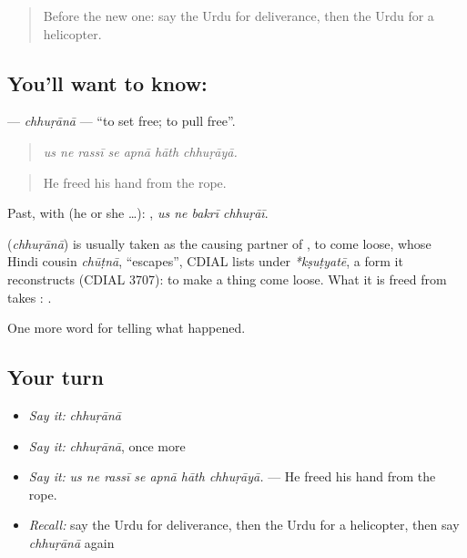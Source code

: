 \begin{quote}
Before the new one: say the Urdu for deliverance, then the Urdu for a helicopter.
\end{quote}

\subsection*{You'll want to know: }
\textbf{} — \emph{chhuṛānā} — \textquotedblleft{}to set free; to pull free\textquotedblright{}.

\begin{quote}
      
\end{quote}

\begin{quote}
\emph{us ne rassī se apnā hāth chhuṛāyā.}
\end{quote}

\begin{quote}
He freed his hand from the rope.
\end{quote}

Past, with  (he or she …):    , \emph{us ne bakrī chhuṛāī}.

\begin{cousinweb}
\textbf{} (\emph{chhuṛānā}) is usually taken as the causing partner of \textbf{}, to come loose, whose Hindi cousin \emph{chūṭnā}, \textquotedblleft{}escapes\textquotedblright{}, CDIAL lists under \emph{*kṣuṭyatē}, a form it reconstructs (CDIAL 3707): to make a thing come loose. What it is freed from takes \textbf{}: \textbf{   }.
\end{cousinweb}

\begin{grammarlens}[title={What you've built}]
One more word for telling what happened.
\end{grammarlens}

\subsection*{Your turn}
\begin{itemize}
\raggedright
  \item \emph{Say it:} \emph{chhuṛānā}
  \item \emph{Say it:} \emph{chhuṛānā}, once more
  \item \emph{Say it:} \emph{us ne rassī se apnā hāth chhuṛāyā.} — He freed his hand from the rope.
  \item \emph{Recall:} say the Urdu for deliverance, then the Urdu for a helicopter, then say \emph{chhuṛānā} again
\end{itemize}

